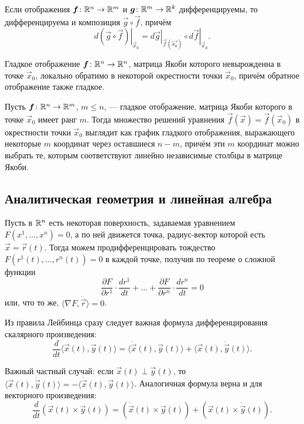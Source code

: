 \begin{theorem}
	Если отображения $\boldsymbol{f}\colon \mathbb{R}^n \to \mathbb{R}^m$ и $\boldsymbol{g}\colon \mathbb{R}^m \to \mathbb{R}^k$ дифференцируемы, то дифференцируема и композиция $\vec{g} \circ \vec{f}$, причём
	\[
		\left.d(\vec{g} \circ \vec{f})\right|_{\vec{x}_0} = \left.d\vec{g}\right|_{\vec{f}(\vec{x_0})} \circ \left.d\vec{f}\right|_{\vec{x}_0}.
	\]
\end{theorem}

\begin{theorem}
	Гладкое отображение $\boldsymbol{f}\colon \mathbb{R}^n \to \mathbb{R}^n$, матрица Якоби которого невырожденна в точке $\vec{x}_0$, локально обратимо в некоторой окрестности точки $\vec{x}_0$, причём обратное отображение также гладкое.
\end{theorem}

\begin{theorem}
	Пусть $\boldsymbol{f}\colon \mathbb{R}^n \to \mathbb{R}^m$, $m \leqslant n$, --- гладкое отображение, матрица Якоби которого в точке $\vec{x}_0$ имеет ранг $m$. Тогда множество решений уравнения $\vec{f}(\vec{x}) = \vec{f}(\vec{x}_0)$ в окрестности точки $\vec{x}_0$ выглядит как график гладкого отображения, выражающего некоторые $m$ координат через оставшиеся $n - m$, причём эти $m$ координат можно выбрать те, которым соответствуют линейно независимые столбцы в матрице Якоби.
\end{theorem}

\subsection*{Аналитическая геометрия и линейная алгебра}

Пусть в $\mathbb{R}^n$ есть некоторая поверхность, задаваемая уравнением $F(x^1, \ldots, x^n) = 0$, а по ней движется точка, радиус-вектор которой есть $\vec{x} = \vec{r}(t)$. Тогда можем продифференцировать тождество $F(r^1(t), \ldots, r^n(t)) = 0$ в каждой точке, получив по теореме о сложной функции
\[
	\frac{\partial F}{\partial r^1} \cdot \frac{d r^1}{dt} + \ldots + \frac{\partial F}{\partial r^n} \cdot \frac{d r^n}{dt} = 0
\]
или, что то же, $\langle \nabla F, \dot{\vec{r}} \rangle = 0$.

Из правила Лейбинца сразу следует важная формула дифференцирования скалярного произведения:
\[
	\frac{d}{dt}\langle \vec{x}(t), \vec{y}(t) \rangle = \langle \dot{\vec{x}}(t), \vec{y}(t) \rangle + \langle \vec{x}(t), \dot{\vec{y}}(t) \rangle.
\]

Важный частный случай: если $\vec{x}(t) \perp \vec{y}(t)$, то $\langle\vec{x}(t), \dot{\vec{y}}(t)\rangle = -\langle\dot{\vec{x}}(t), \vec{y}(t)\rangle$. Аналогичная формула верна и для векторного произведения:
\[
	\frac{d}{dt}(\vec{x}(t) \times \vec{y}(t)) = (\dot{\vec{x}}(t) \times \vec{y}(t)) + (\vec{x}(t) \times \dot{\vec{y}}(t)).
\]


